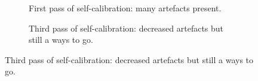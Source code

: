 \begin{figure}[t!]
\centering
\begin{subfigure}{.43\textwidth}
\caption{\label{fig.residuals.3c295.selfcal.uvcut.SC1}First pass of self-calibration: many artefacts present.}
\end{subfigure}
\hfill
\begin{subfigure}{.43\textwidth}
\caption{\label{fig.residuals.3c295.selfcal.uvcut.SC3} Third pass of self-calibration: decreased artefacts but still a ways to go.}

\end{subfigure}
\end{figure}
